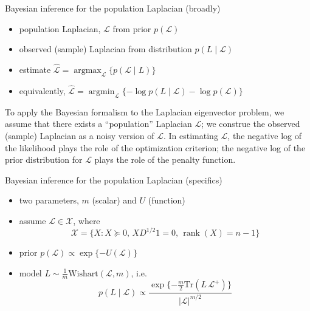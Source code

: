 \documentclass[xcolor=dvipsnames]{beamer}
\DeclareMathOperator*{\argmax}{argmax}
\DeclareMathOperator*{\argmin}{argmin}
\DeclareMathOperator{\rank}{rank}
\begin{document}
\begin{frame}
\begin{block}{Bayesian inference for the population Laplacian (broadly)}
  \begin{itemize}
    \item population Laplacian, $\mathcal{L}$ from prior $p(\mathcal{L})$
    \item observed (sample) Laplacian from distribution $p(L \mid \mathcal{L})$
    \item estimate $\mathcal{\hat L} = \argmax_{\mathcal{L}} \{ p(\mathcal{L} \mid L) \}$
    \item equivalently,
      $\mathcal{\hat L} = \argmin_{\mathcal{L}} \{ -\log p(L \mid \mathcal{L}) -\log p(\mathcal{L}) \}$
  \end{itemize}
\end{block}

  To apply the Bayesian formalism to the Laplacian eigenvector problem, we
assume that there exists a ``population'' Laplacian $\mathcal{L}$; we construe
the observed (sample) Laplacian as a noisy version of $\mathcal{L}$.  In
estimating $\mathcal{L}$, the negative log of the likelihood plays the role of
the optimization criterion; the negative log of the prior distribution for
$\mathcal{L}$ plays the role of the penalty function.

\end{frame}


\begin{frame}
\begin{block}{Bayesian inference for the population Laplacian (specifics)}
  \begin{itemize}
    \item two parameters, $m$ (scalar) and $U$ (function)
    \item assume $\mathcal{L} \in \mathcal{X}$, where
      \[
        \mathcal{X} = \{ X : X \succeq 0, \, X D^{1/2} 1 = 0, \, \rank(X) = n - 1 \}
      \]
    \item prior
      \(
        p(\mathcal{L}) \propto \exp\{ - U(\mathcal{L})\}
      \)
    \item model $L \sim \tfrac{1}{m} \mathrm{Wishart}(\mathcal{L}, m)$, i.e.
      \[
        p(L \mid \mathcal{L})
          \propto
            \frac{\exp\{-\frac{m}{2} \mathrm{Tr}(L \, \mathcal{L}^+)\}}
                 {|\mathcal{L}|^{m/2}} 
      \]
  \end{itemize}
\end{block}
\end{frame}
\end{document}
